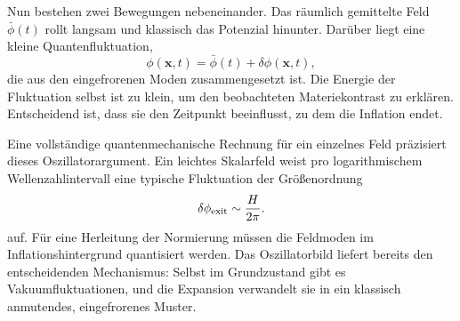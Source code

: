 \begin{classroomqa}
\end{classroomqa}

\begin{classroomqa}
\end{classroomqa}

\begin{classroomqa}
\end{classroomqa}

Nun bestehen zwei Bewegungen nebeneinander. Das räumlich gemittelte Feld \(\bar\phi(t)\) rollt langsam und klassisch das Potenzial hinunter. Darüber liegt eine kleine Quantenfluktuation,
\[
\phi(\mathbf x,t)=\bar\phi(t)+\delta\phi(\mathbf x,t),
\]
die aus den eingefrorenen Moden zusammengesetzt ist. Die Energie der Fluktuation selbst ist zu klein, um den beobachteten Materiekontrast zu erklären. Entscheidend ist, dass sie den Zeitpunkt beeinflusst, zu dem die Inflation endet.

Eine vollständige quantenmechanische Rechnung für ein einzelnes Feld präzisiert dieses Oszillatorargument. Ein leichtes Skalarfeld weist pro logarithmischem Wellenzahlintervall eine typische Fluktuation der Größenordnung
\begin{equation}
\delta\phi_{\rm exit}\sim\frac{H}{2\pi}.
\label{eq:c10-field-amplitude}
\end{equation}
auf. Für eine Herleitung der Normierung müssen die Feldmoden im Inflationshintergrund quantisiert werden. Das Oszillatorbild liefert bereits den entscheidenden Mechanismus: Selbst im Grundzustand gibt es Vakuumfluktuationen, und die Expansion verwandelt sie in ein klassisch anmutendes, eingefrorenes Muster.

